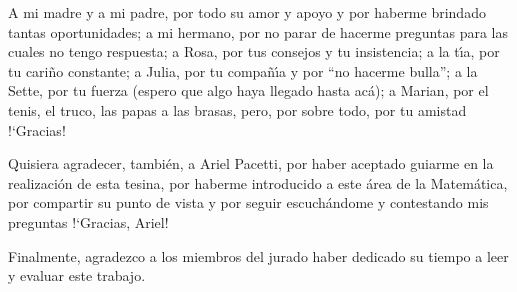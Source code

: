 A mi madre y a mi padre, por todo su amor y apoyo y por haberme brindado tantas
oportunidades; a mi hermano, por no parar de hacerme preguntas para las cuales
no tengo respuesta; a Rosa, por tus consejos y tu insistencia; a la t\'{\i}a,
por tu cari\~{n}o constante; a Julia, por tu compa\~{n}\'{\i}a y por ``no
hacerme bulla''; a la Sette, por tu fuerza (espero que algo haya llegado hasta
ac\'{a}); a Marian, por el tenis, el truco, las papas a las brasas, pero, por
sobre todo, por tu amistad !`Gracias!

Quisiera agradecer, tambi\'{e}n, a Ariel Pacetti, por haber aceptado guiarme en
la realizaci\'{o}n de esta tesina, por haberme introducido a este \'{a}rea de
la Matem\'{a}tica, por compartir su punto de vista y por seguir
escuch\'{a}ndome y contestando mis preguntas !`Gracias, Ariel!

Finalmente, agradezco a los miembros del jurado haber dedicado su tiempo a leer
y evaluar este trabajo.
